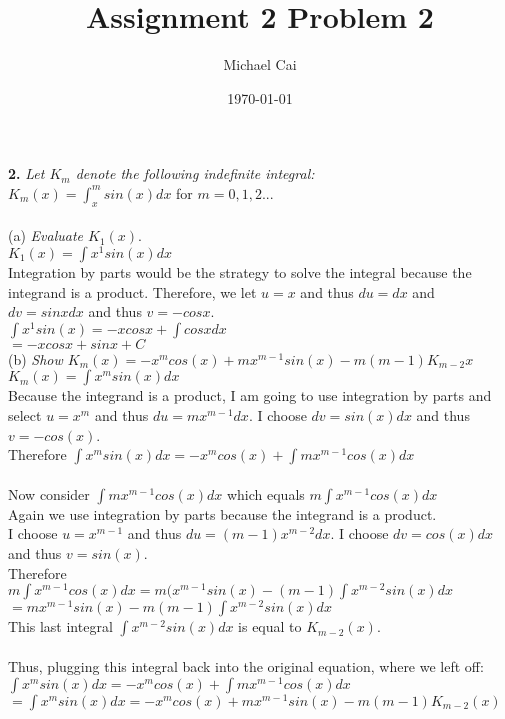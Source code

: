 \documentclass[11pt, oneside]{article}   	%
\title{Assignment 2 Problem 2}
\author{Michael Cai}
\date{\today}							%
\begin{document}
\maketitle

\noindent \textbf{2.} \textit{Let $K_m$ denote the following indefinite integral:}\\
$K_m(x) = \int_ x^m sin(x)dx$ for $m = 0,1,2...$\\~\\
(a) \textit{Evaluate $K_1(x)$}. \\
$K_1(x) = \int x^1 sin(x)dx$\\
Integration by parts would be the strategy to solve the integral because the integrand is a product. Therefore, we let $u = x$ and thus $du = dx$ and $dv = sinxdx$ and thus $v = -cosx$.\\
$\int x^1 sin(x) = -xcosx + \int cosxdx$ \\
$ = -xcosx + sinx + C$\\

\noindent (b) \textit {Show $K_m(x) = -x^m cos(x) + mx^{m-1}sin(x) - m(m-1)K_{m-2}x$}\\
$K_m(x) = \int x^m sin(x)dx$\\
Because the integrand is a product, I am going to use integration by parts and select $u = x^m$ and thus $du = mx^{m-1}dx$. I choose $dv = sin(x)dx$ and thus $v = -cos(x)$. \\
Therefore $\int x^msin(x)dx = -x^mcos(x) + \int mx^{m-1}cos(x)dx$\\~\\
Now consider $\int mx^{m-1}cos(x)dx$ which equals $m \int x^{m-1}cos(x)dx$\\
Again we use integration by parts because the integrand is a product.\\
I choose $u = x^{m-1}$ and thus $du = (m-1)x^{m-2}dx$. I choose $dv = cos(x)dx$ and thus $v = sin(x)$.\\
Therefore $m \int x^{m-1} cos(x)dx = m(x^{m-1}sin(x) - (m-1) \int x^{m-2}sin(x)dx$\\
$= mx^{m-1}sin(x)-m(m-1) \int x^{m-2} sin(x)dx$\\
This last integral $\int x^{m-2} sin(x)dx$ is equal to $K_{m-2}(x)$. \\~\\
Thus, plugging this integral back into the original equation, where we left off: \\
$\int x^msin(x)dx = -x^mcos(x) + \int mx^{m-1}cos(x)dx$\\
$= \int x^msin(x)dx = -x^mcos(x) + mx^{m-1}sin(x)-m(m-1) K_{m-2}(x)$\\~\\~\\
\end{document}
